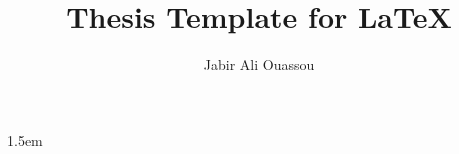 \documentclass[a4paper,twoside,11pt]{memoir}
\begin{document}
	\graphicspath{{/home/shomec/e/espenjv/Semester Project/Figures/}}

	\title{Thesis Template for \LaTeX}
	\author{Jabir Ali Ouassou}
	
	\frontmatter
        
	\clearpage

	\pdfbookmark{\abstractname}{\abstractname}
	
	\clearpage

	\pdfbookmark{\contentsname}{\contentsname}
	\tableofcontents*
	\clearpage
	

	\mainmatter
	\setcounter{secnumdepth}{2}

	
	
	
	
	
	
	
	

	\appendix
	

	\backmatter
        \begingroup
        \emergencystretch 1.5em
	\printbibliography
        \endgroup
	\printindex
\end{document}
